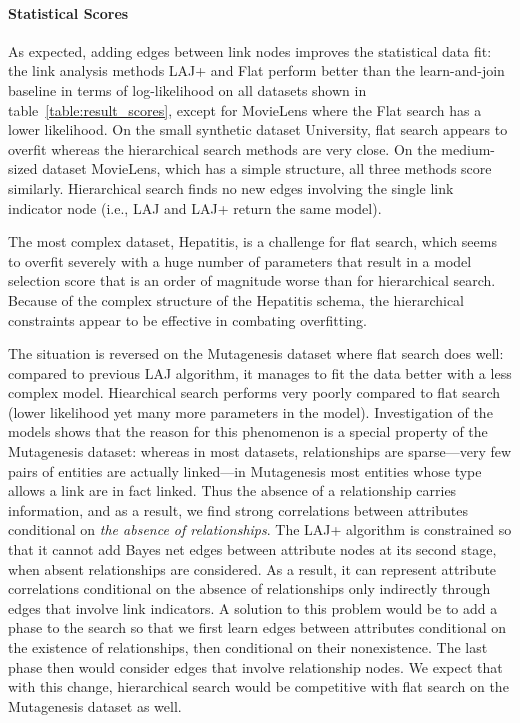 \documentclass{article}
\begin{document}
\paragraph{Statistical Scores}

As expected, adding edges between link nodes improves the statistical data fit: 
the link analysis methods LAJ+ and Flat perform better than the learn-and-join baseline in terms of log-likelihood on all datasets shown in table~\ref{table:result_scores}, except for MovieLens where the Flat search has a lower likelihood. On the small synthetic dataset University, flat search appears to overfit whereas the hierarchical search methods are very close. On the medium-sized dataset MovieLens, which has a simple structure, all three methods score similarly. Hierarchical search finds no new edges involving the single link indicator node (i.e., LAJ and LAJ+ return the same model). 

The most complex dataset, Hepatitis, is a challenge for flat search, which seems to overfit severely with a huge number of parameters that result in a model selection score that is an order of magnitude worse than for hierarchical search. Because of the complex structure of the Hepatitis schema, the hierarchical constraints appear to be effective in combating overfitting.

 The situation is reversed on the Mutagenesis dataset where flat search does well: compared to previous LAJ algorithm, %
it manages to fit the data better with a less complex model. 
Hiearchical search performs very poorly compared to flat search (lower likelihood yet many more parameters in the model). 
Investigation of the models shows that the reason for this phenomenon is a special property of the Mutagenesis dataset: 
whereas in most datasets, relationships are sparse---very few pairs of entities are actually linked---in Mutagenesis most entities whose type allows a link are in fact linked. Thus the absence of a relationship carries information, and
as a result, we find strong correlations between attributes conditional on {\em the absence of relationships}. 
The LAJ+ algorithm is constrained so that it cannot add Bayes net edges between attribute nodes at its second stage, when absent relationships are considered. 
As a result, it can represent attribute correlations conditional on the absence of relationships only indirectly through edges that involve link indicators. 
A solution to this problem would be to add a phase to  the search so that we first learn edges between attributes conditional on the existence of relationships, 
then conditional on their nonexistence. The last phase then would consider edges that involve relationship nodes. We expect that with this change, hierarchical search would be competitive with flat search on the Mutagenesis dataset as well.
\end{document}
